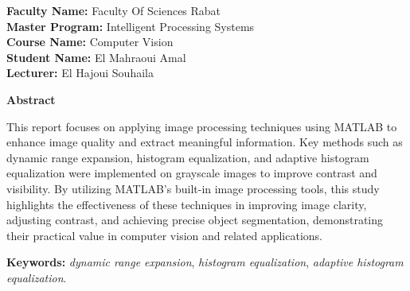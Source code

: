 \documentclass[a4paper,12pt]{article}
\date{}
\makeatletter
\let\@articletype\@empty \def\articletype#1{\gdef\@articletype{{\fontsize{14}{16}\selectfont #1}}}
\def\title#1{
  \gdef\@title{
    \ifx\@articletype\@empty\else\@articletype~\\\fi%
     #1}
}
\def\abstractname{\textbf{Abstract}}
\renewenvironment{onecolabstract}
{\vspace*{-.4pc}\trivlist\item[]\leftskip1pt\noindent\selectfont\hfill\abstractname\hfill\mbox{\null}\par\ignorespaces}{\endtrivlist}
\makeatother
\begin{document}
\title{Assignment 01: Basic Image Processing}

\def\RunningHead{
Basic Image Processing
}
\def\RunningAuthor{Basic Image Processing}
\date{Submitted on: December 3, 2024} 

\maketitle

\vspace{-2em} 

\begin{center}
    \textbf{Faculty Name:} Faculty Of Sciences Rabat\\
    \textbf{Master Program:} Intelligent Processing Systems\\
    \textbf{Course Name:} Computer Vision\\
    \textbf{Student Name:} El Mahraoui Amal \\
    \textbf{Lecturer:} El Hajoui Souhaila \\
\end{center}




{\begin{onecolabstract}
This report focuses on applying image processing techniques using MATLAB to enhance image quality and extract meaningful information. Key methods such as dynamic range expansion, histogram equalization, and adaptive histogram equalization were implemented on grayscale images to improve contrast and visibility. By utilizing MATLAB's built-in image processing tools, this study highlights the effectiveness of these techniques in improving image clarity, adjusting contrast, and achieving precise object segmentation, demonstrating their practical value in computer vision and related applications.

\def\keywordstitle{Keywords}
\smallskip\noindent\textbf{Keywords: }{\normalfont
\textit{dynamic range expansion}, \textit{histogram equalization}, \textit{adaptive histogram equalization}.
}
\end{onecolabstract}}
 
\end{document}
